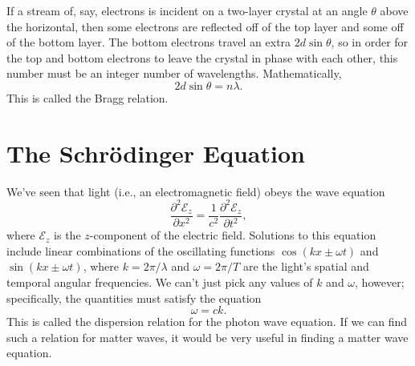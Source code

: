 \documentclass[../p052main.tex]{subfiles}
\begin{document}
If a stream of, say, electrons is incident on a two-layer crystal at an angle $\theta$ above the horizontal, then some electrons are reflected off of the top layer and some off of the bottom layer.
The bottom electrons travel an extra $2d\sin\theta$, so in order for the top and bottom electrons to leave the crystal in phase with each other, this number must be an integer number of wavelengths.
Mathematically,
\[ 2d \sin\theta = n \lambda. \]
This is called the Bragg relation.



\section{The Schrödinger Equation}%
We've seen that light (i.e., an electromagnetic field) obeys the wave equation
\[ \frac{\partial^2 \mathcal{E}_z}{\partial x^2} = \frac{1}{c^2} \frac{\partial^2 \mathcal{E}_z}{\partial t^2}, \]
where $\mathcal{E}_z$ is the $z$-component of the electric field.
Solutions to this equation include linear combinations of the oscillating functions $\cos (kx \pm \omega t)$ and $\sin (kx \pm \omega t)$, where $k = 2\pi / \lambda$ and $\omega = 2\pi / T$ are the light's spatial and temporal angular frequencies.
We can't just pick any values of $k$ and $\omega$, however; specifically, the quantities must satisfy the equation
\[ \omega = ck. \]
This is called the dispersion relation for the photon wave equation.
If we can find such a relation for matter waves, it would be very useful in finding a matter wave equation.
\end{document}

